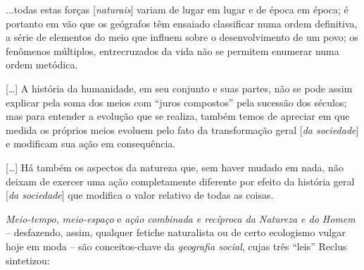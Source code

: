 \begin{citacao}
...todas estas forças [\textit{naturais}] variam de lugar em lugar e de época em época; é portanto em vão que os geógrafos têm ensaiado classificar numa ordem definitiva, a série de elementos do meio que influem sobre o desenvolvimento de um povo; os fenômenos múltiplos, entrecruzados da vida não se permitem enumerar numa ordem metódica.

[{\dots}] A história da humanidade, em seu conjunto e suas partes, não se pode assim explicar pela soma dos meios com ``juros compostos'' pela sucessão dos séculos; mas para entender a evolução que se realiza, também temos de apreciar em que medida os próprios meios evoluem pelo fato da transformação geral [\textit{da sociedade}] e modificam sua ação em consequência.  

[{\dots}] Há também os aspectos da natureza que, sem haver mudado em nada, não deixam de exercer uma ação completamente diferente por efeito da história geral [\textit{da sociedade}] que modifica o valor relativo de todas as coisas. \cite[pp.~112-114]{RECLUS1905a}
\end{citacao}

\textit{Meio-tempo,} \textit{meio-espaço }e \textit{ação combinada e recíproca da Natureza e do Homem} -- desfazendo, assim, qualquer fetiche naturalista ou de certo ecologismo vulgar hoje em moda -- são conceitos-chave da \textit{geografia social}, cujas três ``leis'' Reclus sintetizou:

